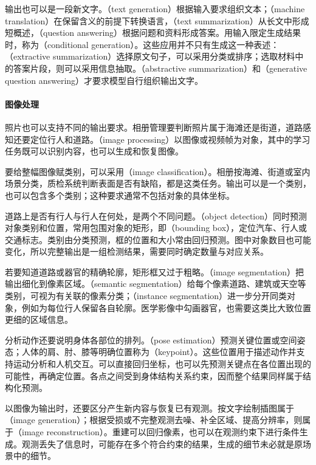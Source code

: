 输出也可以是一段新文字。（text generation）根据输入要求组织文本；（machine translation）在保留含义的前提下转换语言，（text summarization）从长文中形成短概述，（question answering）根据问题和资料形成答案。用输入限定生成结果时，称为（conditional generation）。这些应用并不只有生成这一种表述：（extractive summarization）选择原文句子，可以采用分类或排序；选取材料中的答案片段，则可以采用信息抽取。（abstractive summarization）和（generative question answering）才要求模型自行组织输出文字。

\paragraph{图像处理}
照片也可以支持不同的输出要求。相册管理要判断照片属于海滩还是街道，道路感知还要定位行人和道路。（image processing）以图像或视频帧为对象，其中的学习任务既可以识别内容，也可以生成和恢复图像。

要给整幅图像赋类别，可以采用（image classification）。相册按海滩、街道或室内场景分类，质检系统判断表面是否有缺陷，都是这类任务。输出可以是一个类别，也可以包含多个类别；这种要求通常不包括对象的具体坐标。

道路上是否有行人与行人在何处，是两个不同问题。（object detection）同时预测对象类别和位置，常用包围对象的矩形，即（bounding box），定位汽车、行人或交通标志。类别由分类预测，框的位置和大小常由回归预测。图中对象数目也可能变化，所以完整输出是一组检测结果，需要同时确定数量与对应关系。

若要知道道路或器官的精确轮廓，矩形框又过于粗略。（image segmentation）把输出细化到像素区域。（semantic segmentation）给每个像素道路、建筑或天空等类别，可视为有关联的像素分类；（instance segmentation）进一步分开同类对象，例如为每位行人保留各自轮廓。医学影像中勾画器官，也需要这类比大致位置更细的区域信息。

分析动作还要说明身体各部位的排列。（pose estimation）预测关键位置或空间姿态；人体的肩、肘、膝等明确位置称为（keypoint）。这些位置用于描述动作并支持运动分析和人机交互。可以直接回归坐标，也可以先预测关键点在各位置出现的可能性，再确定位置。各点之间受到身体结构关系约束，因而整个结果同样属于结构化预测。

以图像为输出时，还要区分产生新内容与恢复已有观测。按文字绘制插图属于（image generation）；根据受损或不完整观测去噪、补全区域、提高分辨率，则属于（image reconstruction）。重建可以回归像素，也可以在观测约束下进行条件生成。观测丢失了信息时，可能存在多个符合约束的结果，生成的细节未必就是原场景中的细节。

